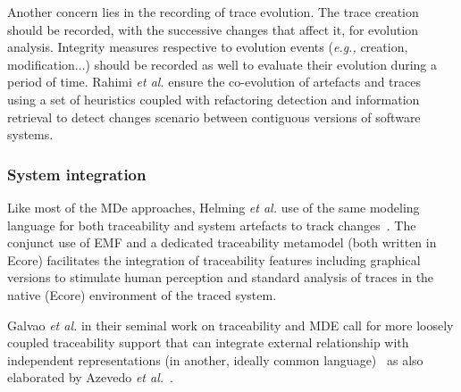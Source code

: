 Another concern lies in the recording of trace evolution. The trace creation should be recorded, with the successive changes that affect it, for evolution analysis. Integrity measures respective to evolution events (\textit{e.g.,} creation, modification...) should be recorded as well to evaluate their evolution during a period of time. Rahimi \textit{et al.} ensure the co-evolution of artefacts and traces~\cite{rahimi2019-Evolving-trace-req2source} using a set of heuristics coupled with refactoring detection and information retrieval to detect changes scenario between contiguous versions of software systems.

\subsubsection{System integration} 
Like most of the MDe approaches, Helming \textit{et al.} use of the same modeling language for both traceability and system artefacts to track changes~\cite{helming2009-traceability-change-awareness}. The conjunct use of EMF and a dedicated traceability metamodel (both written in Ecore) facilitates the integration of traceability features including graphical versions to stimulate human perception and standard analysis of traces in the native (Ecore) environment of the traced system. 

Galvao \textit{et al.} in their seminal work on traceability and MDE call for more loosely coupled traceability support that can integrate external relationship with independent representations (in another, ideally common language)~\cite{galvao2007-survey-traceability-in-MDE} as also elaborated by Azevedo \textit{et al.}~\cite{azevedo2019-traceability-metamodel-and-reference-model}. 



